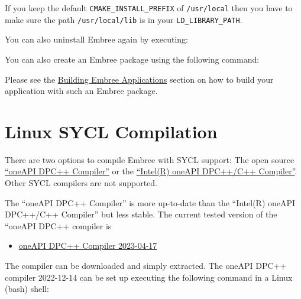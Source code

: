 If you keep the default \texttt{CMAKE\_INSTALL\_PREFIX} of
\texttt{/usr/local} then you have to make sure the path
\texttt{/usr/local/lib} is in your \texttt{LD\_LIBRARY\_PATH}.

You can also uninstall Embree again by executing:

\begin{Shaded}
\begin{Highlighting}[]
\end{Highlighting}
\end{Shaded}

You can also create an Embree package using the following command:

\begin{Shaded}
\begin{Highlighting}[]
\end{Highlighting}
\end{Shaded}

Please see the \hyperref[building-embree-applications]{Building Embree
Applications} section on how to build your application with such an
Embree package.

\section{Linux SYCL Compilation}\label{linux-sycl-compilation}

There are two options to compile Embree with SYCL support: The open
source \href{https://github.com/intel/llvm/}{``oneAPI DPC++ Compiler''}
or the
\href{https://www.intel.com/content/www/us/en/developer/articles/tool/oneapi-standalone-components.html\#dpcpp-cpp}{``Intel(R)
oneAPI DPC++/C++ Compiler''}. Other SYCL compilers are not supported.

The ``oneAPI DPC++ Compiler'' is more up-to-date than the ``Intel(R)
oneAPI DPC++/C++ Compiler'' but less stable. The current tested version
of the ``oneAPI DPC++ compiler is

\begin{itemize}
\tightlist
\item
  \href{https://github.com/intel/llvm/releases/download/sycl-nightly\%2F20230417/dpcpp-compiler.tar.gz}{oneAPI
  DPC++ Compiler 2023-04-17}
\end{itemize}

The compiler can be downloaded and simply extracted. The oneAPI DPC++
compiler 2022-12-14 can be set up executing the following command in a
Linux (bash) shell:

